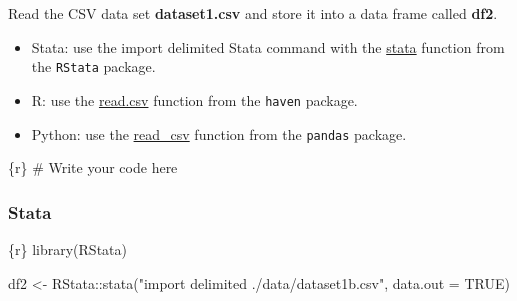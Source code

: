 \documentclass[
  letterpaper,
  DIV=11,
  numbers=noendperiod,
  oneside]{scrreprt}
\newenvironment{Shaded}{\begin{snugshade}}{\end{snugshade}}
\newcommand{\AttributeTok}[1]{\textcolor[rgb]{0.40,0.45,0.13}{#1}}
\newcommand{\CommentTok}[1]{\textcolor[rgb]{0.37,0.37,0.37}{#1}}
\newcommand{\ConstantTok}[1]{\textcolor[rgb]{0.56,0.35,0.01}{#1}}
\newcommand{\FunctionTok}[1]{\textcolor[rgb]{0.28,0.35,0.67}{#1}}
\newcommand{\InformationTok}[1]{\textcolor[rgb]{0.37,0.37,0.37}{#1}}
\newcommand{\NormalTok}[1]{\textcolor[rgb]{0.00,0.23,0.31}{#1}}
\newcommand{\OtherTok}[1]{\textcolor[rgb]{0.00,0.23,0.31}{#1}}
\newcommand{\SpecialCharTok}[1]{\textcolor[rgb]{0.37,0.37,0.37}{#1}}
\newcommand{\StringTok}[1]{\textcolor[rgb]{0.13,0.47,0.30}{#1}}
\providecommand{\tightlist}{%
  \setlength{\itemsep}{0pt}\setlength{\parskip}{0pt}}\usepackage{longtable,booktabs,array}
\begin{document}
Read the CSV data set \textbf{dataset1.csv} and store it into a data
frame called \textbf{df2}.

\begin{tcolorbox}[enhanced jigsaw, colbacktitle=quarto-callout-tip-color!10!white, titlerule=0mm, breakable, opacityback=0, opacitybacktitle=0.6, left=2mm, coltitle=black, colback=white, title=\textcolor{quarto-callout-tip-color}{\faLightbulb}\hspace{0.5em}{Tip}, rightrule=.15mm, colframe=quarto-callout-tip-color-frame, toprule=.15mm, bottomtitle=1mm, toptitle=1mm, arc=.35mm, bottomrule=.15mm, leftrule=.75mm]

\begin{itemize}
\tightlist
\item
  Stata: use the import delimited Stata command with the
  \href{https://rdrr.io/github/lbraglia/RStata/man/stata.html}{stata}
  function from the \texttt{RStata} package.
\item
  R: use the
  \href{https://www.rdocumentation.org/packages/utils/versions/3.6.2/topics/read.table}{read.csv}
  function from the \texttt{haven} package.
\item
  Python: use the
  \href{https://pandas.pydata.org/docs/reference/api/pandas.read_csv.html}{read\_csv}
  function from the \texttt{pandas} package.
\end{itemize}

\end{tcolorbox}

\begin{Shaded}
\begin{Highlighting}[]
\InformationTok{\textasciigrave{}\textasciigrave{}\textasciigrave{}\{r\}}
\CommentTok{\# Write your code here}
\InformationTok{\textasciigrave{}\textasciigrave{}\textasciigrave{}}
\end{Highlighting}
\end{Shaded}

\hypertarget{stata-1}{%
\subsubsection{Stata}\label{stata-1}}

\begin{Shaded}
\begin{Highlighting}[]
\InformationTok{\textasciigrave{}\textasciigrave{}\textasciigrave{}\{r\}}
\FunctionTok{library}\NormalTok{(RStata)}

\NormalTok{df2 }\OtherTok{\textless{}{-}}\NormalTok{ RStata}\SpecialCharTok{::}\FunctionTok{stata}\NormalTok{(}\StringTok{"import delimited ./data/dataset1b.csv"}\NormalTok{,}
                     \AttributeTok{data.out =} \ConstantTok{TRUE}\NormalTok{)}
\InformationTok{\textasciigrave{}\textasciigrave{}\textasciigrave{}}
\end{Highlighting}
\end{Shaded}
\end{document}
